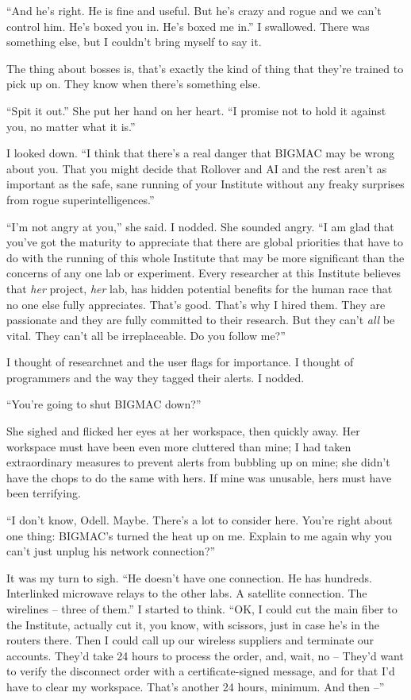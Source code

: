 “And he's right. He is fine and useful. But he's crazy and rogue and 
we can't control him. He's boxed you in. He's boxed me in.” I 
swallowed. There was something else, but I couldn't bring myself to say 
it.

The thing about bosses is, that's exactly the kind of thing that 
they're trained to pick up on. They know when there's something else.

“Spit it out.” She put her hand on her heart. “I promise not to 
hold it against you, no matter what it is.”

I looked down. “I think that there's a real danger that BIGMAC may be 
wrong about you. That you might decide that Rollover and AI and the 
rest aren't as important as the safe, sane running of your Institute 
without any freaky surprises from rogue superintelligences.”

“I'm not angry at you,” she said. I nodded. She sounded angry. “I 
am glad that you've got the maturity to appreciate that there are 
global priorities that have to do with the running of this whole 
Institute that may be more significant than the concerns of any one lab 
or experiment. Every researcher at this Institute believes that 
\emph{her} project, \emph{her} lab, has hidden potential benefits for 
the human race that no one else fully appreciates. That's good. That's 
why I hired them. They are passionate and they are fully committed to 
their research. But they can't \emph{all} be vital. They can't all be 
irreplaceable. Do you follow me?”

I thought of researchnet and the user flags for importance. I thought 
of programmers and the way they tagged their alerts. I nodded.

“You're going to shut BIGMAC down?”

She sighed and flicked her eyes at her workspace, then quickly away. 
Her workspace must have been even more cluttered than mine; I had taken 
extraordinary measures to prevent alerts from bubbling up on mine; she 
didn't have the chops to do the same with hers. If mine was unusable, 
hers must have been terrifying.

“I don't know, Odell. Maybe. There's a lot to consider here. You're 
right about one thing: BIGMAC's turned the heat up on me. Explain to me 
again why you can't just unplug his network connection?”

It was my turn to sigh. “He doesn't have one connection. He has 
hundreds. Interlinked microwave relays to the other labs. A satellite 
connection. The wirelines -- three of them.” I started to think. 
“OK, I could cut the main fiber to the Institute, actually cut it, 
you know, with scissors, just in case he's in the routers there. Then I 
could call up our wireless suppliers and terminate our accounts. They'd 
take 24 hours to process the order, and, wait, no -- They'd want to 
verify the disconnect order with a certificate-signed message, and for 
that I'd have to clear my workspace. That's another 24 hours, minimum. 
And then --”

